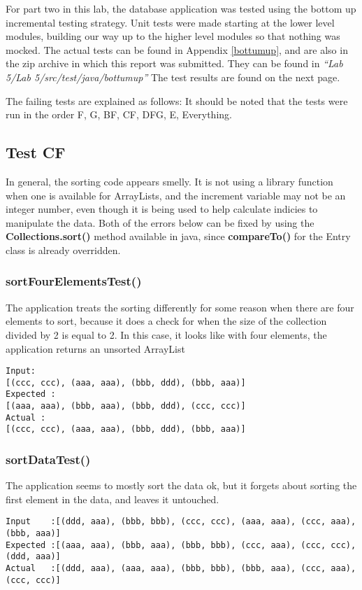 For part two in this lab, the database application was tested using the bottom
up incremental testing strategy. Unit tests were made starting at the lower
level modules, building our way up to the higher level modules so that nothing
was mocked. The
actual tests can be found in Appendix \ref{bottumup}, and are also in the zip
archive in which this report was submitted. They can be found in
\emph{``Lab 5/Lab 5/src/test/java/bottumup''} The test results are found on the
next page.
%


The failing tests are explained as follows:
It should be noted that the tests were run in the order F, G, BF, CF, DFG, E,
Everything.
\subsection{Test CF}
In general, the sorting code appears smelly. It is not using a library function
when one is available for ArrayLists, and the increment variable may not be an
integer number, even though it is being used to help calculate indicies to
manipulate the data. Both of the errors below can be fixed by using the
\textbf{Collections.sort()} method available in java, since \textbf{compareTo()}
for the Entry class is already overridden.
\subsubsection{sortFourElementsTest()}
The application treats the sorting differently for some reason when there are
four elements to sort, because it does a check for when the size of the
collection divided by 2 is equal to 2. In this case, it looks like with four
elements, the application returns an unsorted ArrayList

\begin{verbatim}
Input:
[(ccc, ccc), (aaa, aaa), (bbb, ddd), (bbb, aaa)]
Expected :
[(aaa, aaa), (bbb, aaa), (bbb, ddd), (ccc, ccc)]
Actual :
[(ccc, ccc), (aaa, aaa), (bbb, ddd), (bbb, aaa)]
\end{verbatim}

\subsubsection{sortDataTest()}
The application seems to mostly sort the data ok, but it forgets about sorting
the first element in the data, and leaves it untouched.

\begin{verbatim}
Input    :[(ddd, aaa), (bbb, bbb), (ccc, ccc), (aaa, aaa), (ccc, aaa), (bbb, aaa)]   
Expected :[(aaa, aaa), (bbb, aaa), (bbb, bbb), (ccc, aaa), (ccc, ccc), (ddd, aaa)]
Actual   :[(ddd, aaa), (aaa, aaa), (bbb, bbb), (bbb, aaa), (ccc, aaa), (ccc, ccc)]
\end{verbatim}


